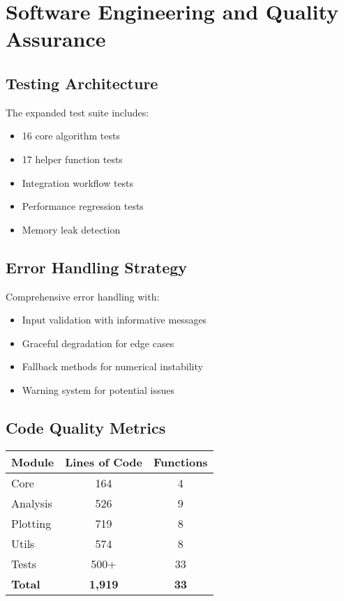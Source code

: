 \documentclass[11pt,a4paper]{article}
\begin{document}
\section{Software Engineering and Quality Assurance}

\subsection{Testing Architecture}

The expanded test suite includes:
\begin{itemize}
    \item 16 core algorithm tests
    \item 17 helper function tests
    \item Integration workflow tests
    \item Performance regression tests
    \item Memory leak detection
\end{itemize}

\subsection{Error Handling Strategy}

Comprehensive error handling with:
\begin{itemize}
    \item Input validation with informative messages
    \item Graceful degradation for edge cases
    \item Fallback methods for numerical instability
    \item Warning system for potential issues
\end{itemize}

\subsection{Code Quality Metrics}

\begin{center}
\begin{tabular}{|l|c|c|}
\hline
\textbf{Module} & \textbf{Lines of Code} & \textbf{Functions} \\
\hline
Core & 164 & 4 \\
Analysis & 526 & 9 \\
Plotting & 719 & 8 \\
Utils & 574 & 8 \\
Tests & 500+ & 33 \\
\hline
\textbf{Total} & \textbf{1,919} & \textbf{33} \\
\hline
\end{tabular}
\end{center}
\end{document}
